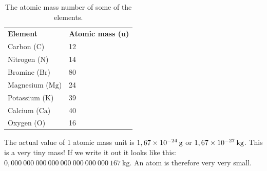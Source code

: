  
          \begin{table}[H]
        \begin{center}
      \label{m38756*uid8}
    \noindent
      \tablelasttail{}
      \begin{xtabular}[t]{|l|l|}\hline
                  \textbf{Element}
                 &
                  \textbf{Atomic mass (u)}
     \tabularnewline{}
        Carbon ($\text{C}$) &
        12%
     \tabularnewline{}
        Nitrogen ($\text{N}$) &
        14%
     \tabularnewline{}
        Bromine ($\text{Br}$) &
        80%
     \tabularnewline{}
        Magnesium ($\text{Mg}$) &
        24%
     \tabularnewline{}
        Potassium ($\text{K}$) &
        39%
     \tabularnewline{}
        Calcium ($\text{Ca}$) &
        40%
     \tabularnewline{}
        Oxygen ($\text{O}$) &
        16%
     \tabularnewline{}
    \end{xtabular}
      \end{center}
    \caption{The atomic mass number of some of the elements.}
\label{tab:atomic mass}
\end{table}
    \par
        \label{m38756*id255096}The actual value of 1 atomic mass unit is $1,67\ensuremath{\times}{10}^{-24}\phantom{\rule{2pt}{0ex}}\text{g}$ or $1,67\ensuremath{\times}{10}^{-27}\phantom{\rule{2pt}{0ex}}\text{kg}$. This is a very tiny mass! If we write it out it looks like this: $0,000~000~000~000~000~000~000~000~167~\text{kg}$. An atom is therefore very very small.\par 
\label{m38756*eip-320}
